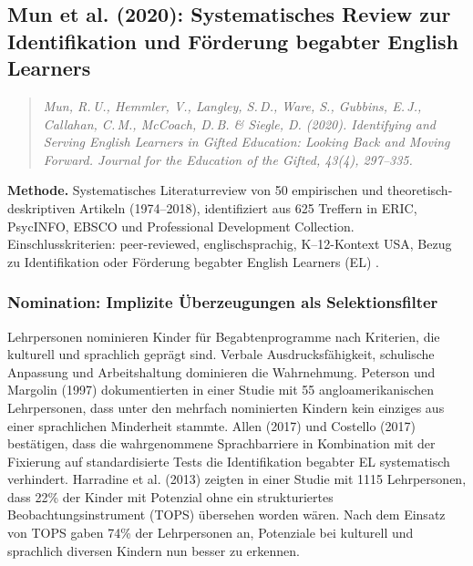 \documentclass[ngerman, a4paper]{article}
\begin{document}
\subsection*{Mun et al. (2020): Systematisches Review zur Identifikation
  und Förderung begabter English Learners}
\label{subsec:mun2020}

\begin{quote}\itshape
  Mun, R.\,U., Hemmler, V., Langley, S.\,D., Ware, S.,
  Gubbins, E.\,J., Callahan, C.\,M., McCoach, D.\,B. \& Siegle, D.
  (2020). Identifying and Serving English Learners in Gifted Education:
  Looking Back and Moving Forward. \upshape Journal for the Education of
  the Gifted, 43(4), 297--335.
\end{quote}

\textbf{Methode.} Systematisches Literaturreview von 50 empirischen und
theoretisch-deskriptiven Artikeln (1974--2018), identifiziert aus 625
Treffern in ERIC, PsycINFO, EBSCO und Professional Development Collection.
Einschlusskriterien: peer-reviewed, englischsprachig, K--12-Kontext USA,
Bezug zu Identifikation oder Förderung begabter English Learners (EL)
\parencite[S.\,302--304]{mun2020identifying}.

\subsubsection*{Nomination: Implizite Überzeugungen als Selektionsfilter}

Lehrpersonen nominieren Kinder für Begabtenprogramme nach Kriterien, die
kulturell und sprachlich geprägt sind. Verbale Ausdrucksfähigkeit,
schulische Anpassung und Arbeitshaltung dominieren die Wahrnehmung.
Peterson und Margolin (1997) dokumentierten in einer Studie mit 55
angloamerikanischen Lehrpersonen, dass unter den mehrfach nominierten
Kindern kein einziges aus einer sprachlichen Minderheit stammte. Allen
(2017) und Costello (2017) bestätigen, dass die wahrgenommene
Sprachbarriere in Kombination mit der Fixierung auf standardisierte Tests
die Identifikation begabter EL systematisch verhindert. Harradine et al.
(2013) zeigten in einer Studie mit 1115 Lehrpersonen, dass 22\% der
Kinder mit Potenzial ohne ein strukturiertes Beobachtungsinstrument (TOPS)
übersehen worden wären. Nach dem Einsatz von TOPS gaben 74\% der
Lehrpersonen an, Potenziale bei kulturell und sprachlich diversen Kindern
nun besser zu erkennen.
\end{document}
